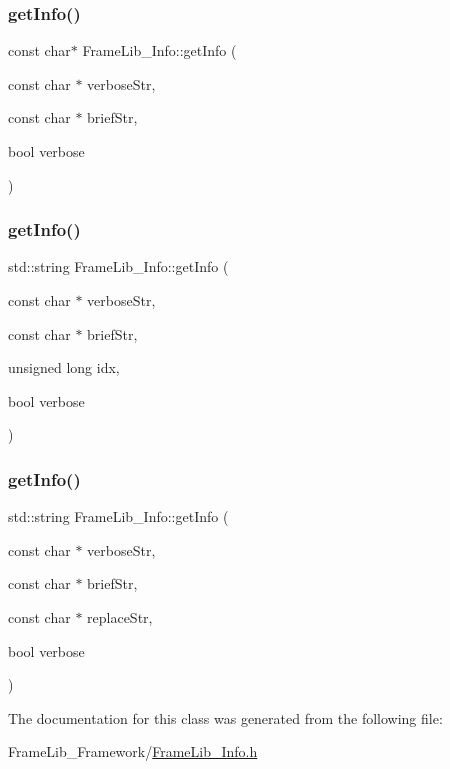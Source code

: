 \subsubsection{\texorpdfstring{get\+Info()}{getInfo()}\hspace{0.1cm}{\footnotesize\ttfamily [1/3]}}
{\footnotesize\ttfamily const char$\ast$ Frame\+Lib\+\_\+\+Info\+::get\+Info (\begin{DoxyParamCaption}\item[{const char $\ast$}]{verbose\+Str,  }\item[{const char $\ast$}]{brief\+Str,  }\item[{bool}]{verbose }\end{DoxyParamCaption})\hspace{0.3cm}{\ttfamily [inline]}}

\mbox{\label{class_frame_lib___info_a25dcefc87f96b26a1cd17592b9b09f6f}} 
\subsubsection{\texorpdfstring{get\+Info()}{getInfo()}\hspace{0.1cm}{\footnotesize\ttfamily [2/3]}}
{\footnotesize\ttfamily std\+::string Frame\+Lib\+\_\+\+Info\+::get\+Info (\begin{DoxyParamCaption}\item[{const char $\ast$}]{verbose\+Str,  }\item[{const char $\ast$}]{brief\+Str,  }\item[{unsigned long}]{idx,  }\item[{bool}]{verbose }\end{DoxyParamCaption})\hspace{0.3cm}{\ttfamily [inline]}}

\mbox{\label{class_frame_lib___info_aac2ae7aa23772c4580d68ed6b4b493fb}} 
\subsubsection{\texorpdfstring{get\+Info()}{getInfo()}\hspace{0.1cm}{\footnotesize\ttfamily [3/3]}}
{\footnotesize\ttfamily std\+::string Frame\+Lib\+\_\+\+Info\+::get\+Info (\begin{DoxyParamCaption}\item[{const char $\ast$}]{verbose\+Str,  }\item[{const char $\ast$}]{brief\+Str,  }\item[{const char $\ast$}]{replace\+Str,  }\item[{bool}]{verbose }\end{DoxyParamCaption})\hspace{0.3cm}{\ttfamily [inline]}}



The documentation for this class was generated from the following file\+:\begin{DoxyCompactItemize}
\item 
Frame\+Lib\+\_\+\+Framework/\hyperlink{_frame_lib___info_8h}{Frame\+Lib\+\_\+\+Info.\+h}\end{DoxyCompactItemize}
